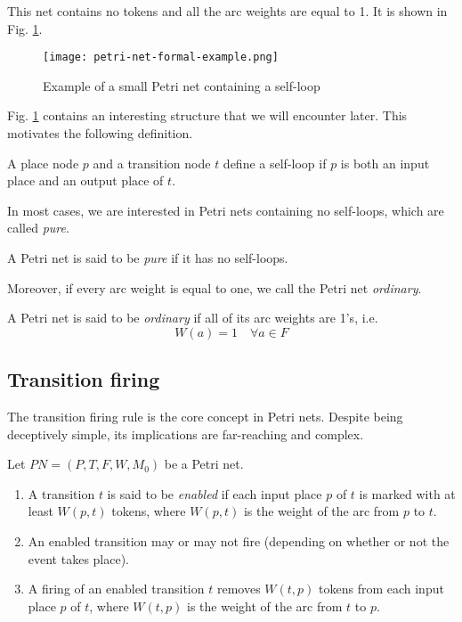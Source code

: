 This net contains no tokens and all the arc weights are equal to 1.
It is shown in Fig. \ref{fig:petri-net-formal-example}.

\begin{figure}[H]
    \centering
    \texttt{[image: petri-net-formal-example.png]}
    \caption{Example of a small Petri net containing a self-loop}
    \label{fig:petri-net-formal-example}
\end{figure}

Fig. \ref{fig:petri-net-formal-example} contains an interesting structure that we will encounter later.
This motivates the following definition.

\begin{definition}
    A place node $p$ and a transition node $t$ define a self-loop
    if $p$ is both an input place and an output place of $t$.
\end{definition}

In most cases, we are interested in Petri nets containing no self-loops, which are called \textit{pure}.

\begin{definition}
    A Petri net is said to be \textit{pure} if it has no self-loops.
\end{definition}

Moreover, if every arc weight is equal to one, we call the Petri net \textit{ordinary}.

\begin{definition}
    A Petri net is said to be \textit{ordinary} if all of its arc weights are 1's, i.e.
    \begin{equation*}
        W(a) = 1 \quad \forall a \in F
    \end{equation*}
\end{definition}

\subsection{Transition firing}
\label{section:transition-firing}

The transition firing rule is the core concept in Petri nets.
Despite being deceptively simple, its implications are far-reaching and complex.

\begin{definition}
    Let $ PN = (P, T, F, W, M_{0}) $ be a Petri net.
    \begin{enumerate}[label=(\roman*)]
        \item A transition $t$ is said to be \textit{enabled} if each input place $p$ of $t$
              is marked with at least $W(p, t)$ tokens, where $W(p,t)$ is the weight of the arc from $p$ to $t$.
        \item An enabled transition may or may not fire (depending on whether or not the event takes place).
        \item A firing of an enabled transition $t$ removes $W(t,p)$ tokens from each input place $p$ of $t$,
              where $W(t, p)$ is the weight of the arc from $t$ to $p$.
    \end{enumerate}
\end{definition}

